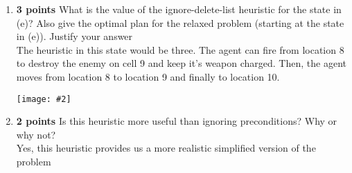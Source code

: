 \documentclass{article}
\def\ans#1{{\color{ans}#1}}
\newcommand{\centerfig}[2]{\begin{center}\texttt{[image: \#2]}\end{center}}
\begin{document}
\begin{enumerate}[label=(\alph*)]
     \ans{
         The heuristic in this state would be one. The agent just has to move to location 10 from 
         location 9 to reach the goal state.
    } \\
    \centerfig{0.75}{../figs/1-h.png}
	\item \textbf{3 points} What is the value of the ignore-delete-list heuristic for the state in (e)? Also give the optimal plan for the relaxed problem (starting at the state in (e)). Justify your answer\\
        \ans{
       The heuristic in this state would be three. The agent can fire from location 8 to destroy the 
       enemy on cell 9 and keep it's weapon charged. Then, the agent moves from location 8 to location 
       9 and finally to location 10.
    } \\
    \centerfig{0.75}{../figs/1-i.png}
	\item \textbf{2 points} Is this heuristic more useful than ignoring preconditions? Why or why not? \\
     \ans{
        Yes, this heuristic provides us a more realistic simplified version of the problem 
    }
    
\end{enumerate}

\clearpage
\end{document}
